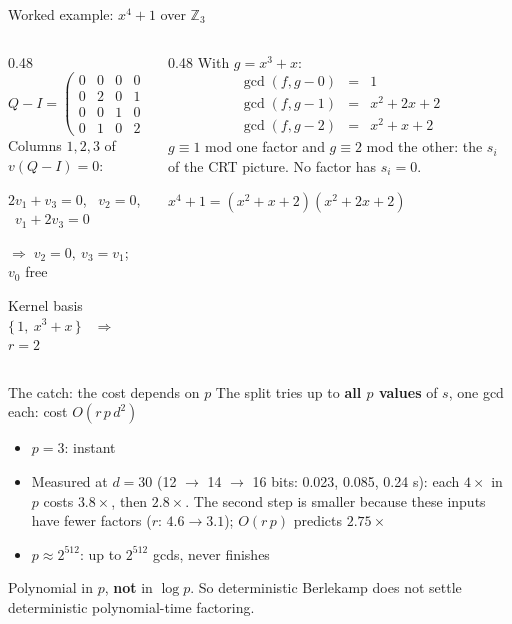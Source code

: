 \documentclass[aspectratio=169,11pt]{beamer}
\newcommand{\aside}[1]{{\color{muted}\small #1}}
\begin{document}
\begin{frame}{Worked example: $x^4 + 1$ over $\mathbb{Z}_3$}
  \begin{columns}[T]
    \begin{column}{0.48\textwidth}
      \[
        Q - I = \begin{pmatrix} 0&0&0&0 \\ 0&2&0&1 \\ 0&0&1&0 \\ 0&1&0&2 \end{pmatrix}
      \]
      Columns $1, 2, 3$ of $v(Q-I) = 0$:\par
      $2v_1 + v_3 = 0$, \ $v_2 = 0$, \ $v_1 + 2v_3 = 0$\par
      $\Rightarrow\; v_2 = 0,\ v_3 = v_1$; \ $v_0$ free\par\medskip
      Kernel basis \ $\{\,1,\ x^3 + x\,\}$ \ $\Rightarrow$ \ $r = 2$
    \end{column}
    \begin{column}{0.48\textwidth}
      With $g = x^3 + x$:
      \[
      \begin{array}{rcl}
        \gcd(f, g - 0) &=& 1 \\
        \gcd(f, g - 1) &=& x^2 + 2x + 2 \\
        \gcd(f, g - 2) &=& x^2 + x + 2
      \end{array}
      \]
      \aside{$g \equiv 1$ mod one factor and $g \equiv 2$ mod the other: the $s_i$ of the CRT picture. No factor has $s_i = 0$.}
      \begin{block}{}
        \centering $x^4 + 1 = (x^2 + x + 2)(x^2 + 2x + 2)$
      \end{block}
    \end{column}
  \end{columns}
\end{frame}

\begin{frame}{The catch: the cost depends on $p$}
  The split tries up to \textbf{all $p$ values} of $s$, one gcd each: \quad cost $O(r\,p\,d^2)$
  \bigskip
  \begin{itemize}
    \item $p = 3$: instant
    \item Measured at $d = 30$ (12 $\to$ 14 $\to$ 16 bits: 0.023, 0.085, 0.24 s): each $4\times$ in $p$ costs $3.8\times$, then $2.8\times$. The second step is smaller because these inputs have fewer factors ($r$: $4.6 \to 3.1$); $O(r\,p)$ predicts $2.75\times$
    \item $p \approx 2^{512}$: up to $2^{512}$ gcds, never finishes
  \end{itemize}
  \bigskip
  \begin{block}{}
    Polynomial in $p$, \textbf{not} in $\log p$. So deterministic Berlekamp does not settle
    deterministic polynomial-time factoring.
  \end{block}
\end{frame}
\end{document}
